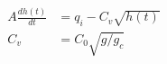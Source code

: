 \begin{equation}
  \begin{aligned}
    A \frac{dh(t)}{dt} & = q_i - C_v \sqrt{h(t)}
    \\
    C_v                & = C_0 \sqrt{g / g_c}
  \end{aligned}  \label{eq:liquid_storage01_1}
\end{equation}